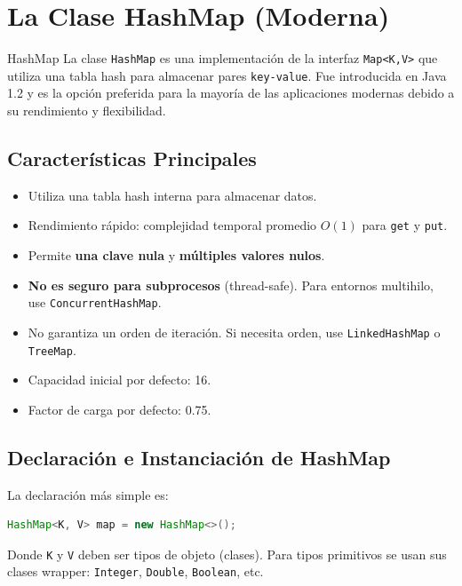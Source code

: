 \section{La Clase HashMap (Moderna)}
\label{sec:hashmap}

\begin{definicion}{HashMap}
La clase \texttt{HashMap} es una implementación de la interfaz \texttt{Map<K,V>} que utiliza una tabla hash para almacenar pares \texttt{key-value}. Fue introducida en Java 1.2 y es la opción preferida para la mayoría de las aplicaciones modernas debido a su rendimiento y flexibilidad.
\end{definicion}

\subsection{Características Principales}
\begin{itemize}
    \item Utiliza una tabla hash interna para almacenar datos.
    \item Rendimiento rápido: complejidad temporal promedio \(O(1)\) para \texttt{get} y \texttt{put}.
    \item Permite \textbf{una clave nula} y \textbf{múltiples valores nulos}.
    \item \textbf{No es seguro para subprocesos} (thread-safe). Para entornos multihilo, use \texttt{ConcurrentHashMap}.
    \item No garantiza un orden de iteración. Si necesita orden, use \texttt{LinkedHashMap} o \texttt{TreeMap}.
    \item Capacidad inicial por defecto: 16.
    \item Factor de carga por defecto: 0.75.
\end{itemize}

\subsection{Declaración e Instanciación de HashMap}
\label{subsec:declaracion}

La declaración más simple es:

\begin{lstlisting}[language=Java, style=java, caption={Declaración básica de HashMap}]
HashMap<K, V> map = new HashMap<>();
\end{lstlisting}

Donde \texttt{K} y \texttt{V} deben ser tipos de objeto (clases). Para tipos primitivos se usan sus clases wrapper: \texttt{Integer}, \texttt{Double}, \texttt{Boolean}, etc.

